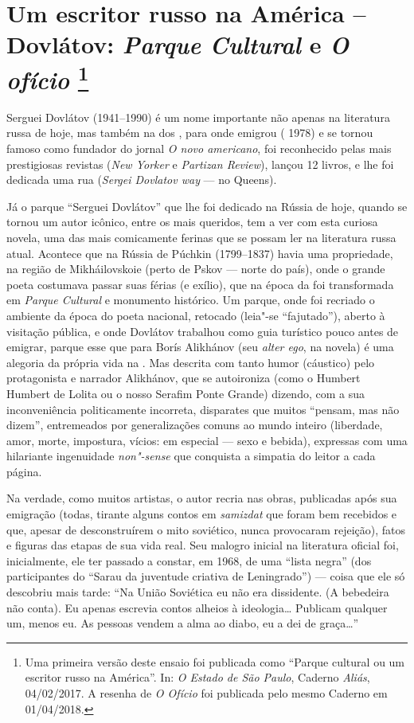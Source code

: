 \chapter{Um escritor russo na América -- Dovlátov: \emph{Parque Cultural} e \emph{O ofício}
\footnote{Uma primeira versão deste ensaio foi publicada como ``Parque cultural ou um escritor russo na América''. In:
  \emph{O Estado de São Paulo}, Caderno \emph{Aliás}, 04/02/2017. A
  resenha de \emph{O Ofício} foi publicada pelo mesmo Caderno em
  01/04/2018.}}

Serguei Dovlátov (1941--1990) é um nome importante não apenas na
literatura russa de hoje, mas também na dos , para onde emigrou (
1978) e se tornou famoso como fundador do jornal \emph{O novo
americano}, foi reconhecido pelas mais prestigiosas revistas (\emph{New
Yorker} e \emph{Partizan Review}), lançou 12 livros, e lhe foi dedicada
uma rua (\emph{Sergei Dovlatov way} --- no Queens).

Já o parque ``Serguei Dovlátov'' que lhe foi dedicado na Rússia de
hoje, quando se tornou um autor icônico, entre os mais queridos, tem a
ver com esta curiosa novela, uma das mais comicamente ferinas que se
possam ler na literatura russa atual. Acontece que na Rússia de Púchkin
(1799--1837) havia uma propriedade, na região de Mikháilovskoie (perto de
Pskov --- norte do país), onde o grande poeta costumava passar suas
férias (e exílio), que na época da  foi transformada em
\emph{Parque Cultural} e monumento histórico. Um parque, onde foi
recriado o ambiente da época do poeta nacional, retocado (leia"-se
``fajutado''), aberto à visitação pública, e onde Dovlátov trabalhou
como guia turístico pouco antes de emigrar, parque esse que para Borís
Alikhánov (seu \emph{alter ego}, na novela) é uma alegoria da própria
vida na . Mas descrita com tanto humor (cáustico) pelo protagonista
e narrador Alikhánov, que se autoironiza (como o Humbert Humbert de
Lolita ou o nosso Serafim Ponte Grande) dizendo, com a sua
inconveniência politicamente incorreta, disparates que muitos ``pensam,
mas não dizem'', entremeados por generalizações comuns ao mundo inteiro
(liberdade, amor, morte, impostura, vícios: em especial --- sexo e
bebida), expressas com uma hilariante ingenuidade \emph{non"-sense} que
conquista a simpatia do leitor a cada página.

Na verdade, como muitos artistas, o autor recria nas obras, publicadas
após sua emigração (todas, tirante alguns contos em \emph{samizdat} que
foram bem recebidos e que, apesar de desconstruírem o mito soviético,
nunca provocaram rejeição), fatos e figuras das etapas de sua vida
real. Seu malogro inicial na literatura oficial foi, inicialmente, ele
ter passado a constar, em 1968, de uma ``lista negra'' (dos
participantes do ``Sarau da juventude criativa de Leningrado'') --- coisa
que ele só descobriu mais tarde: ``Na União Soviética eu não era
dissidente. (A bebedeira não conta). Eu apenas escrevia contos alheios à
ideologia\ldots{} Publicam qualquer um, menos eu. As pessoas vendem a alma ao
diabo, eu a dei de graça\ldots{}''

